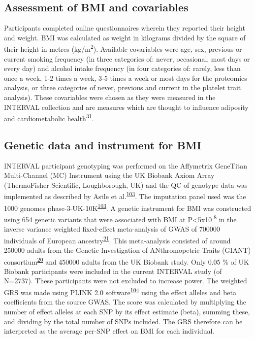 \documentclass[11pt,twoside]{bristolthesis}
\begin{document}
\hypertarget{assessment-of-bmi-and-covariables}{%
\subsection{Assessment of BMI and covariables}\label{assessment-of-bmi-and-covariables}}

Participants completed online questionnaires wherein they reported their height and weight. BMI was calculated as weight in kilograms divided by the square of their height in metres (kg/m\textsuperscript{2}). Available covariables were age, sex, previous or current smoking frequency (in three categories of: never, occasional, most days or every day) and alcohol intake frequency (in four categories of: rarely, less than once a week, 1-2 times a week, 3-5 times a week or most days for the proteomics analysis, or three categories of never, previous and current in the platelet trait analysis). These covariables were chosen as they were measured in the INTERVAL collection and are measures which are thought to influence adiposity and cardiometabolic health\textsuperscript{\protect\hyperlink{ref-Bell2018a}{31}}.

\hypertarget{genetic-data-and-instrument-for-bmi}{%
\subsection{Genetic data and instrument for BMI}\label{genetic-data-and-instrument-for-bmi}}

INTERVAL participant genotyping was performed on the Affymetrix GeneTitan Multi-Channel (MC) Instrument using the UK Biobank Axiom Array (ThermoFisher Scientific, Loughborough, UK) and the QC of genotype data was implemented as described by Astle et al.\textsuperscript{\protect\hyperlink{ref-Astle2016}{103}}. The imputation panel used was the 1000 genomes phase-3-UK-10K\textsuperscript{\protect\hyperlink{ref-Astle2016}{103}}. A genetic instrument for BMI was constructed using 654 genetic variants that were associated with BMI at P\textless5x10\textsuperscript{-8} in the inverse variance weighted fixed-effect meta-analysis of GWAS of 700000 individuals of European ancestry\textsuperscript{\protect\hyperlink{ref-Yengo2018}{21}}. This meta-analysis consisted of around 250000 adults from the Genetic Investigation of ANthromopetric Traits (GIANT) consortium\textsuperscript{\protect\hyperlink{ref-Locke2015}{20}} and 450000 adults from the UK Biobank study. Only 0.05 \% of UK Biobank participants were included in the current INTERVAL study (of N=2737). These participants were not excluded to increase power. The weighted GRS was made using PLINK 2.0 software\textsuperscript{\protect\hyperlink{ref-Purcell2007a}{104}} using the effect alleles and beta coefficients from the source GWAS. The score was calculated by multiplying the number of effect alleles at each SNP by its effect estimate (beta), summing these, and dividing by the total number of SNPs included. The GRS therefore can be interpreted as the average per-SNP effect on BMI for each individual.
\end{document}
